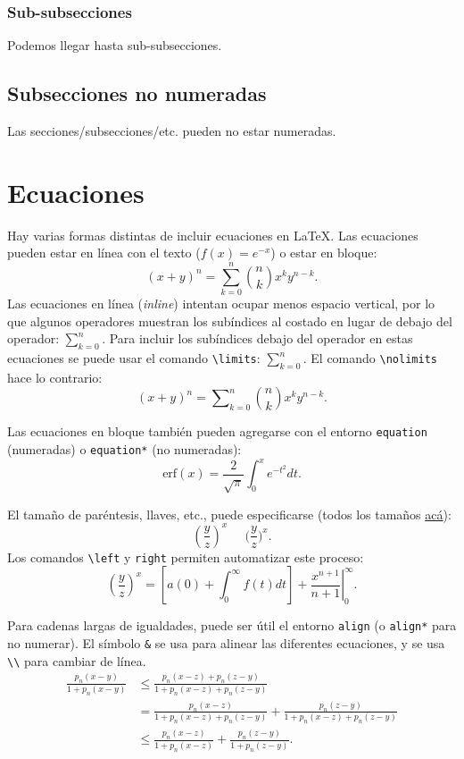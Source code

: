 \documentclass[12pt, spanish]{report}
\theoremstyle{definition} %
\theoremstyle{remark} %
\theoremstyle{plain} %
\theoremstyle{plain} %
\theoremstyle{plain} %
\theoremstyle{plain} %
\theoremstyle{plain} %
\theoremstyle{remark} %
\numberwithin{defn}{chapter}
\begin{document}
\subsubsection{Sub-subsecciones}

Podemos llegar hasta sub-subsecciones.

\subsection*{Subsecciones no numeradas}

Las secciones/subsecciones/etc. pueden no estar numeradas.


\section{Ecuaciones}

Hay varias formas distintas de incluir ecuaciones en \LaTeX. Las ecuaciones pueden estar en línea con el texto ($f(x) = e^{-x}$) o estar en bloque: 
\[
(x+y)^n = \sum_{k=0}^n \binom{n}{k} x^k y^{n-k}.
\]
Las ecuaciones en línea (\textit{inline}) intentan ocupar menos espacio vertical, por lo que algunos operadores muestran los subíndices al costado en lugar de debajo del operador: $\sum_{k=0}^n$. Para incluir los subíndices debajo del operador en estas ecuaciones se puede usar el comando \verb|\limits|: $\sum\limits_{k=0}^n$. El comando \verb|\nolimits| hace lo contrario:
\[
(x+y)^n = \sum\nolimits_{k=0}^n \binom{n}{k} x^k y^{n-k}.
\]

Las ecuaciones en bloque también pueden agregarse con el entorno \verb|equation| (numeradas) o \verb|equation*| (no numeradas):
\begin{equation}
    \text{erf}(x) = \frac{2}{\sqrt{\pi}} \int_0^x e^{-t^2} dt.
\end{equation}

El tamaño de paréntesis, llaves, etc., puede especificarse (todos los tamaños \href{www.overleaf.com/learn/latex/Brackets_and_Parentheses}{acá}): \[
    (\frac{y}{z})^x\;\;\;\;\;\Big(\frac{y}{z}\Big)^x.
\]
Los comandos \verb|\left| y \verb|right| permiten automatizar este proceso:
\[
    \left(\frac{y}{z}\right)^x = \left[ a(0) + \int_0^\infty f(t)dt\right] + \left. \frac{x^{n+1}}{n+1} \right|_0^\infty.
\]

Para cadenas largas de igualdades, puede ser útil el entorno \verb|align| (o \verb|align*| para no numerar). El símbolo \verb|&| se usa para alinear las diferentes ecuaciones, y se usa \verb|\\| para cambiar de línea.
\begin{align*}
    \frac{p_n(x - y)}{1 + p_n(x - y)} &\leq \frac{p_n(x - z) + p_n(z - y)}{1 + p_n(x - z) + p_n(z - y)} \\
    &= \frac{p_n(x - z)}{1 + p_n(x - z) + p_n(z - y)} + \frac{p_n(z - y)}{1 + p_n(x - z) + p_n(z - y)} \\
    &\leq \frac{p_n(x - z)}{1 + p_n(x - z)} + \frac{p_n(z - y)}{1 + p_n(z - y)}.
\end{align*}
\end{document}
